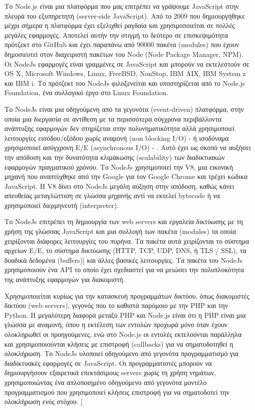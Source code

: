 		Το Node.js είναι μια πλατφόρμα που μας επιτρέπει να γράψουμε JavaScript στην πλευρά του εξυπηρετητή (server-side JavaScript). Από το 2009 που δημιουργήθηκε μέχρι σήμερα η πλατφόρμα έχει εξελιχθεί ραγδαία και χρησιμοποιείται σε πολλές μεγάλες εφαρμογές. Αποτελεί αυτήν την στιγμή το δεύτερο σε επισκεψιμότητα πρότζεκτ στο GitHub και έχει παραπάνω από 90000 πακέτα (modules) που έχουν δημοσιευτεί στον διαχειριστή πακέτων του Node (Node Package Manager, NPM). Οι NodeJs εφαρμογές είναι γραμμένες σε JavaScript και μπορούν να εκτελεστούν σε OS X, Microsoft Windows, Linux, FreeBSD, NonStop, IBM AIX, IBM System z και IBM i. Το πρότζεκτ του NodeJs φιλοξενείται και υποστηρίζεται από το Node.js Foundation,  ένα συλλογικό έργο στο  Linux Foundation. \cite{Tilkov2010}

		Το NodeJs είναι μια οδηγούμενη από τα γεγονότα (event-driven) πλατφόρμα,  στην οποία μια διεργασία σε αντίθεση με τα περισσότερα σύγχρονα περιβάλλοντα ανάπτυξης εφαρμογών  δεν στηρίζεται στην πολυνηματικότητα αλλά χρησιμοποιεί λειτουργίες εισόδου/εξόδου χωρίς αναμονή (non blocking I/O) - ή ισοδύναμα χρησιμοποιεί ασύγχρονη Ε/Ε (asynchronous I/O) - . Αυτό έχει ως σκοπό να αυξήσει την απόδοση και την δυνατότητα κλιμάκωσης (scalability) των διαδικτυακών εφαρμογών πραγματικού χρόνου. Το NodeJs χρησιμοποιεί την V8, μια εικονική μηχανή που αναπτύχθηκε από την Google για τον Google Chrome και τρέχει κώδικα JavaScript. Η V8 δίνει στο NodeJs μεγάλη αύξηση στην απόδοση, καθώς κάνει απευθείας μεταγλώττιση σε γλώσσα μηχανής αντί να εκτελεί bytecode ή να χρησιμοποιεί διερμηνευτή (interpreter).

	Το NodeJs επιτρέπει τη δημιουργία των web servers και εργαλεία δικτύωσης με τη χρήση της γλώσσας JavaScript και μια συλλογή των πακέτα (modules) τα οποία χειρίζονται διάφορες λειτουργίες του πυρήνα. \cite{node}  Τα πακέτα αυτά χειρίζονται το σύστημα αρχείων Ε/Ε, το σύστημα δικτύωσης (HTTP, TCP, UDP, DNS, ή TLS / SSL), τα δυαδικά δεδομένα (buffers)] και άλλες βασικές λειτουργίες. Τα πακέτα του NodeJs χρησιμοποιούν ένα API το οποίο έχει σχεδιαστεί για να μειώσει την πολυπλοκότητα της ανάπτυξης εφαρμογών για διακομιστή.

	Χρησιμοποιείται κυρίως για την κατασκευή προγραμμάτων δικτύου, όπως διακομιστές δικτύου (web servers), γεγονός που το καθιστά παρόμοιο με την PHP και την Python. Η μεγαλύτερη διαφορά μεταξύ PHP και Node.js είναι ότι η PHP είναι μια γλώσσα με αναμονή, όπου η εκτέλεση των εντολών προχωρά μόνο όταν έχουν ολοκληρωθεί οι προηγούμενες, ενώ στο Node.js  οι εντολές εκτελούνται παράλληλα και χρησιμοποιούνται  κλήσεις με επιστροφή (callbacks) για να σηματοδοτηθεί η ολοκλήρωση. Το NodeJs υλοποιεί οδηγούμενο από γεγονότα προγραμματισμό για διαδικτυακές εφαρμογές σε JavaScript. Οι προγραμματιστές μπορούν να δημιουργήσουν εξαιρετικά επεκτάσιμους servers χωρίς τη χρήση νημάτων, χρησιμοποιώντας ένα απλοποιημένο οδηγούμενο από γεγονότα μοντέλο προγραμματισμού που χρησιμοποιεί κλήσεις επιστροφή για να σηματοδοτεί την ολοκλήρωση ενός στόχου. [\cite{surenda}

